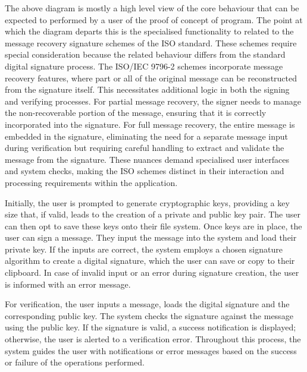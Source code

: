 \documentclass[]{final_report}
\theoremstyle{definition}
\begin{document}
The above diagram is mostly a high level view of the core behaviour that can be expected to performed by a user of the proof of concept of program. The point at which the diagram departs this is the specialised functionality to related to the message recovery signature schemes of the ISO standard. These schemes require special consideration because the related behaviour differs from the standard digital signature process. The ISO/IEC 9796-2 schemes incorporate message recovery features, where part or all of the original message can be reconstructed from the signature itself. This necessitates additional logic in both the signing and verifying processes. For partial message recovery, the signer needs to manage the non-recoverable portion of the message, ensuring that it is correctly incorporated into the signature.   For full message recovery, the entire message is embedded in the signature, eliminating the need for a separate message input during verification but requiring careful handling to extract and validate the message from the signature. These nuances demand specialised user interfaces and system checks, making the ISO schemes distinct in their interaction and processing requirements within the application.

Initially, the user is prompted to generate cryptographic keys, providing a key size that, if valid, leads to the creation of a private and public key pair. The user can then opt to save these keys onto their file system.
Once keys are in place, the user can sign a message. They input the message into the system and load their private key. If the inputs are correct, the system employs a chosen signature algorithm to create a digital signature, which the user can save or copy to their clipboard. In case of invalid input or an error during signature creation, the user is informed with an error message.

For verification, the user inputs a message, loads the digital signature and the corresponding public key. The system checks the signature against the message using the public key. If the signature is valid, a success notification is displayed; otherwise, the user is alerted to a verification error. Throughout this process, the system guides the user with notifications or error messages based on the success or failure of the operations performed.


\newpage

\printbibliography
\label{endpage}
\end{document}
